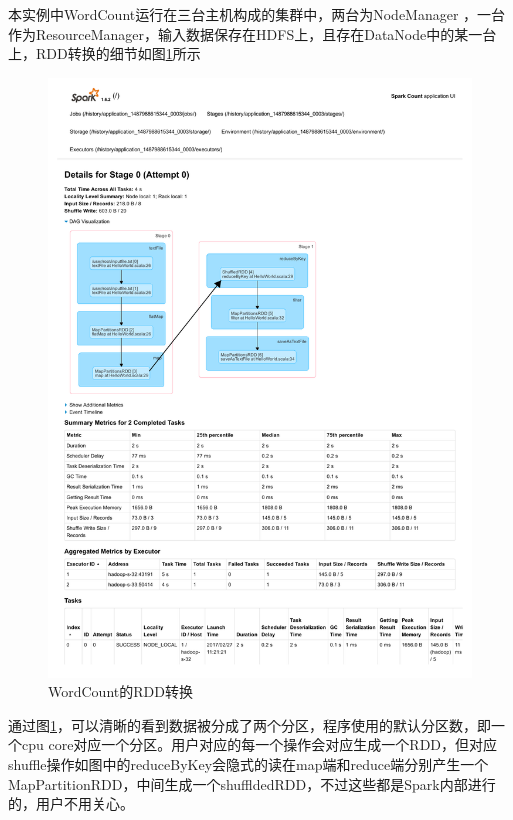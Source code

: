 本实例中WordCount运行在三台主机构成的集群中，两台为NodeManager ，一台作为ResourceManager，输入数据保存在HDFS上，且存在DataNode中的某一台上，RDD转换的细节如图\ref{fig:SparkCountDetails}所示
\begin{figure}[H] 
	\centering
	\includegraphics[width=\textwidth]{figures/SparkCountDetails.pdf}
	\caption{WordCount的RDD转换}
	\label{fig:SparkCountDetails}
\end{figure}

通过图\ref{fig:SparkCountDetails}，可以清晰的看到数据被分成了两个分区，程序使用的默认分区数，即一个cpu core对应一个分区。用户对应的每一个操作会对应生成一个RDD，但对应shuffle操作如图中的reduceByKey会隐式的读在map端和reduce端分别产生一个MapPartitionRDD，中间生成一个shuffldedRDD，不过这些都是Spark内部进行的，用户不用关心。

